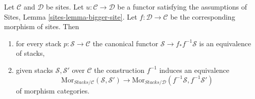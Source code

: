\begin{lemma}
\label{lemma-bigger-site}
Let $\mathcal{C}$ and $\mathcal{D}$ be sites.
Let $u : \mathcal{C} \to \mathcal{D}$ be a functor satisfying the
assumptions of
Sites, Lemma \ref{sites-lemma-bigger-site}.
Let $f : \mathcal{D} \to \mathcal{C}$ be the corresponding
morphism of sites. Then
\begin{enumerate}
\item for every stack $p : \mathcal{S} \to \mathcal{C}$ the
canonical functor $\mathcal{S} \to f_*f^{-1}\mathcal{S}$ is
an equivalence of stacks,
\item given stacks $\mathcal{S}, \mathcal{S}'$ over $\mathcal{C}$
the construction $f^{-1}$
induces an equivalence
$$
\text{Mor}_{\textit{Stacks}/\mathcal{C}}(\mathcal{S}, \mathcal{S}')
\longrightarrow
\text{Mor}_{\textit{Stacks}/\mathcal{D}}(f^{-1}\mathcal{S}, f^{-1}\mathcal{S}')
$$
of morphism categories.
\end{enumerate}
\end{lemma}

